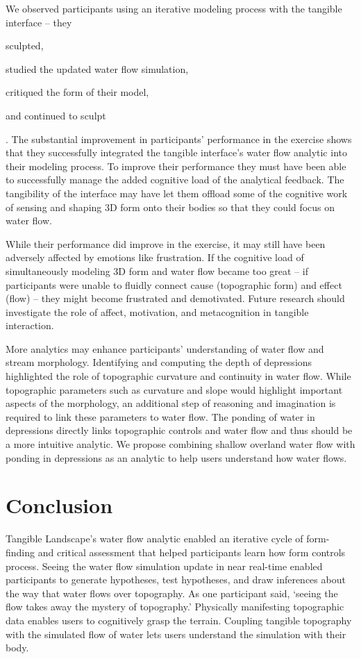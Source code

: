 \documentclass{isprs}
\begin{document}
We observed participants using an iterative modeling process with the tangible interface -- 
they 
\begin{enumerate*}[label=\alph*),font=\itshape]
\item sculpted, 
\item studied the updated water flow simulation, 
\item critiqued the form of their model, 
\item and continued to sculpt
\end{enumerate*}.
%
The substantial improvement in participants' performance in the  exercise
shows that they successfully integrated the tangible interface's water flow analytic 
into their modeling process. 
%
To improve their performance they must have been able to successfully manage 
the added cognitive load of the analytical feedback. 
%
The tangibility of the interface may have let them offload some of the cognitive work of sensing and shaping 3D form onto their bodies so that they could focus on water flow. 

While their performance did improve in the  exercise, it may still have been adversely affected by emotions like frustration. 
%
If the cognitive load of simultaneously modeling 3D form and water flow became too great
-- if participants were unable to fluidly connect cause (topographic form) and effect (flow) --
they might become frustrated and demotivated. 
%
Future research should investigate the role of affect, motivation, and metacognition in tangible interaction.

More analytics may enhance participants' understanding of water flow and stream morphology. 
%
Identifying and computing the depth of depressions highlighted the role of topographic curvature and continuity in water flow. 
%
While topographic parameters such as curvature and slope would highlight important aspects of the morphology, 
an additional step of reasoning and imagination is required to link these parameters to water flow. 
%
The ponding of water in depressions directly links topographic controls and water flow 
and thus should be a more intuitive analytic. 
%
We propose combining shallow overland water flow with ponding in depressions
as an analytic to help users understand how water flows. 

\section{Conclusion}\label{sec:conclusion}
%
Tangible Landscape's water flow analytic enabled an iterative cycle of form-finding and critical assessment that helped participants learn how form controls process. 
%
Seeing the water flow simulation update in near real-time 
enabled participants to generate hypotheses, test hypotheses, and draw inferences 
about the way that water flows over topography. 
%
As one participant said, `seeing the flow takes away the mystery of topography.' 
%
Physically manifesting topographic data enables users to cognitively grasp the terrain. 
Coupling tangible topography with the simulated flow of water 
lets users understand the simulation with their body. 
\end{document}
